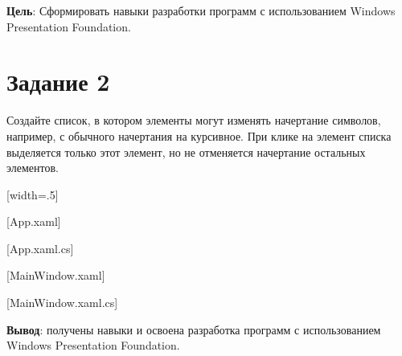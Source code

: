 \documentclass{bsuir}
\begin{document}
\maketitle
\mainmatter
\renewcommand{\thefigure}{\arabic{figure}}
\renewcommand{\thelisting}{\arabic{listing}}

\textbf{Цель}: Сформировать навыки разработки программ с использованием Windows
Presentation Foundation.

\section*{Задание 2}

Создайте список, в котором элементы могут изменять начертание символов,
например, с обычного начертания на курсивное. При клике на элемент списка
выделяется только этот элемент, но не отменяется начертание остальных элементов.

[width=.5\textwidth]

[App.xaml]

[App.xaml.cs]

[MainWindow.xaml]

[MainWindow.xaml.cs]

\textbf{Вывод}: получены навыки и освоена разработка программ с использованием
Windows Presentation Foundation.
\end{document}
